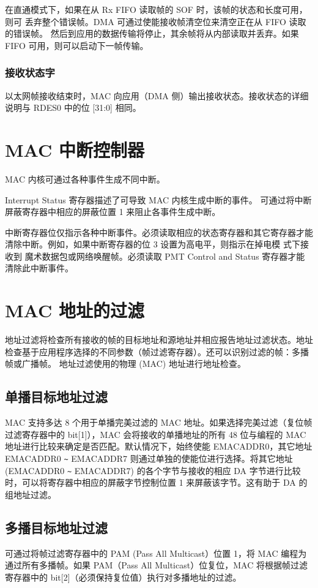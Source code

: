 \documentclass[main\_\_CN.tex]{subfiles}
\begin{document}
在直通模式下，如果在从 Rx FIFO 读取帧的 SOF 时，该帧的状态和长度可用，则可 丢弃整个错误帧。DMA 可通过使能接收帧清空位来清空正在从 FIFO 读取的错误帧。 然后到应用的数据传输将停止，其余帧将从内部读取并丢弃。如果 FIFO 可用，则可以启动下一帧传输。

\subsubsection{接收状态字}
以太网帧接收结束时，MAC 向应用（DMA 侧）输出接收状态。接收状态的详细说明与 RDES0 中的位 [31:0] 相同。

\section{MAC 中断控制器}
MAC 内核可通过各种事件生成不同中断。

Interrupt Status 寄存器描述了可导致 MAC 内核生成中断的事件。 可通过将中断屏蔽寄存器中相应的屏蔽位置 1 来阻止各事件生成中断。

中断寄存器位仅指示各种中断事件。必须读取相应的状态寄存器和其它寄存器才能清除中断。例如，如果中断寄存器的位 3 设置为高电平，则指示在掉电模 式下接收到 魔术数据包或网络唤醒帧。必须读取 PMT Control and Status 寄存器才能清除此中断事件。

\section{MAC 地址的过滤}
地址过滤将检查所有接收的帧的目标地址和源地址并相应报告地址过滤状态。地址检查基于应用程序选择的不同参数（帧过滤寄存器）。还可以识别过滤的帧：多播帧或广播帧。
地址过滤使用的物理 (MAC) 地址进行地址检查。

\subsection{单播目标地址过滤 }
MAC 支持多达 8 个用于单播完美过滤的 MAC 地址。如果选择完美过滤（复位帧过滤寄存器中的 bit[1]），MAC 会将接收的单播地址的所有 48 位与编程的 MAC 地址进行比较来确定是否匹配。默认情况下，始终使能 EMACADDR0，其它地址 EMACADDR0 \verb+~+ EMACADDR7 则通过单独的使能位进行选择。将其它地址 (EMACADDR0 \verb+~+ EMACADDR7) 的各个字节与接收的相应 DA 字节进行比较时，可以将寄存器中相应的屏蔽字节控制位置 1 来屏蔽该字节。这有助于 DA 的组地址过滤。

\subsection{多播目标地址过滤 }
可通过将帧过滤寄存器中的 PAM (Pass All Multicast）位置 1，将 MAC 编程为通过所有多播帧。如果 PAM（Pass All Multicast）位复位，MAC 将根据帧过滤寄存器中的 bit[2]（必须保持复位值）执行对多播地址的过滤。
\end{document}
